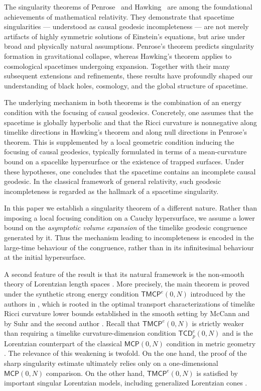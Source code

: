 \documentclass[a4paper,10pt]{article}
\newcommand{\MCP}{\mathsf{MCP}}
\newcommand{\TMCP}{\mathsf{TMCP}}
\newcommand{\TCD}{\mathsf{TCD}}
\theoremstyle{plain}
\theoremstyle{definition}
\numberwithin{equation}{section}
\begin{document}
The singularity theorems of Penrose~\cite{Penrose65} and
Hawking~\cite{Haw:67} are among the foundational achievements of
mathematical relativity. They demonstrate that spacetime singularities
--- understood as causal geodesic incompleteness --- are not merely
artifacts of highly symmetric solutions of Einstein's equations, but arise
under broad and physically natural assumptions. Penrose's theorem predicts
singularity formation in gravitational collapse, whereas Hawking's theorem
applies to cosmological spacetimes undergoing expansion. Together with
their many subsequent extensions and refinements, these results have
profoundly shaped our understanding of black holes, cosmology, and the
global structure of spacetime.

The underlying mechanism in both theorems is the combination of an energy
condition with the focusing of causal geodesics. Concretely, one assumes
that the spacetime is globally hyperbolic and that the Ricci curvature is
nonnegative along timelike directions in Hawking's theorem and along null
directions in Penrose's theorem. This is supplemented by a local geometric
condition inducing the focusing of causal geodesics, typically formulated
in terms of a mean-curvature bound on a spacelike hypersurface or the
existence of trapped surfaces. Under these hypotheses, one concludes that
the spacetime contains an incomplete causal geodesic. In the classical
framework of general relativity, such geodesic incompleteness is regarded
as the hallmark of a spacetime singularity.


In this paper we establish a singularity theorem of a different nature.
Rather than imposing a local focusing condition on a Cauchy hypersurface,
we assume a lower bound on the \emph{asymptotic volume expansion} of the
timelike geodesic congruence generated by it. Thus the mechanism leading
to incompleteness is encoded in the large-time behaviour of the congruence,
rather than in its infinitesimal behaviour at the initial hypersurface.

A second feature of the result is that its natural framework is the
non-smooth theory of Lorentzian length spaces \cite{KS}. More precisely, the
main theorem is proved under the synthetic strong energy condition $\mathsf{TMCP}^{e}(0,N)$ introduced by the authors in \cite{CaMo:20}, which is rooted in the optimal transport characterizations of timelike Ricci curvature lower bounds established in the smooth setting by McCann \cite{McCann} and by Suhr and the second author \cite{MoSu}.
Recall that $\TMCP^e(0,N)$  is strictly weaker than requiring a
timelike curvature-dimension condition $\TCD^e_p(0,N)$ and is the Lorentzian counterpart
of the classical $\MCP(0,N)$ condition in metric geometry \cite{Ohta1, sturm:II}. The relevance of
this weakening is twofold. On the one hand, the proof of the sharp
singularity estimate ultimately relies only on a one-dimensional
$\MCP(0,N)$ comparison. On the other hand, $\TMCP^e(0,N)$ is satisfied by
important singular Lorentzian models, including generalized Lorentzian
cones \cite{CalistiKettererSaemann}.
\smallskip
\end{document}
